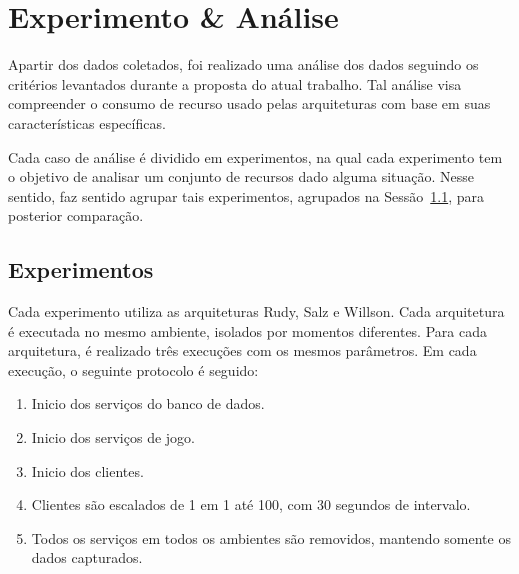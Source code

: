 \chapter{Experimento \& Análise}
\label{cap6}



Apartir dos dados coletados, foi realizado uma análise dos dados seguindo os critérios levantados durante a proposta do atual trabalho.
%
Tal análise visa compreender o consumo de recurso usado pelas arquiteturas com base em suas características específicas.



Cada caso de análise é dividido em experimentos, na qual cada experimento tem o objetivo de analisar um conjunto de recursos dado alguma situação.
%
Nesse sentido, faz sentido agrupar tais experimentos, agrupados na Sessão~\ref{sec:experimentos}, para posterior comparação.





\section{Experimentos}
\label{sec:experimentos}



Cada experimento utiliza as arquiteturas Rudy, Salz e Willson.
%
Cada arquitetura é executada no mesmo ambiente, isolados por momentos diferentes.
%
Para cada arquitetura, é realizado três execuções com os mesmos parâmetros.
%
Em cada execução, o seguinte protocolo é seguido:



\begin{enumerate}
 \item Inicio dos serviços do banco de dados.
 \item Inicio dos serviços de jogo.
 \item Inicio dos clientes.
 \item Clientes são escalados de 1 em 1 até 100, com 30 segundos de intervalo.
 \item Todos os serviços em todos os ambientes são removidos, mantendo somente os dados capturados.
\end{enumerate}



